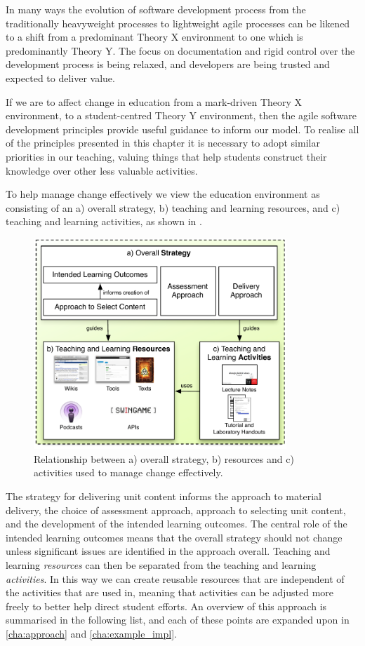 In many ways the evolution of software development process from the traditionally heavyweight processes to lightweight agile processes can be likened to a shift from a predominant Theory X environment to one which is predominantly Theory Y. The focus on documentation and rigid control over the development process is being relaxed, and developers are being trusted and expected to deliver value. 

If we are to affect change in education from a mark-driven Theory X environment, to a student-centred Theory Y environment, then the agile software development principles provide useful guidance to inform our model. To realise all of the principles presented in this chapter it is necessary to adopt similar priorities in our teaching, valuing things that help students construct their knowledge over other less valuable activities.

To help manage change effectively we view the education environment as consisting of an a) overall strategy, b) teaching and learning resources, and c) teaching and learning activities, as shown in . 

\begin{figure}[htbp]
	\centering
	\includegraphics[width=0.85\textwidth]{StrategyResourcesActivities}
	\caption{Relationship between a) overall strategy, b) resources and c) activities used to manage change effectively.}
	\label{fig:strategy}
\end{figure}

The strategy for delivering unit content informs the approach to material delivery, the choice of assessment approach, approach to selecting unit content, and the development of the intended learning outcomes. The central role of the intended learning outcomes means that the overall strategy should not change unless significant issues are identified in the approach overall. Teaching and learning \emph{resources} can then be separated from the teaching and learning \emph{activities}. In this way we can create reusable resources that are independent of the activities that are used in, meaning that activities can be adjusted more freely to better help direct student efforts. An overview of this approach is summarised in the following list, and each of these points are expanded upon in \cref{cha:approach} and \cref{cha:example_impl}.

